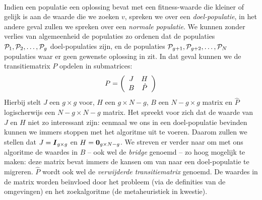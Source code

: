 \paragraph{}

Indien een populatie een oplossing bevat met een fitness-waarde die kleiner of gelijk is aan de waarde die we zoeken $v$, spreken we over een \emph{doel-populatie}, in het andere geval zullen we spreken over een \emph{normale populatie}. We kunnen zonder verlies van algemeenheid de populaties zo ordenen dat de populaties $\PopSet_1,\PopSet_2,\ldots,\PopSet_g$ doel-populaties zijn, en de populaties $\PopSet_{g+1},\PopSet_{g+2},\ldots,\PopSet_N$ populaties waar er geen gewenste oplossing in zit. In dat geval kunnen we de transitiematrix $P$ opdelen in submatrices:
\begin{equation}
P=\brak{\begin{array}{cc}
J&H\\
B&\hat{P}
\end{array}}
\end{equation}
Hierbij stelt $J$ een $g\times g$ voor, $H$ een $g\times N-g$, $B$ een $N-g\times g$ matrix en $\hat{P}$ logischerwijs een $N-g\times N-g$ matrix. Het spreekt voor zich dat de waarde van $J$ en $H$ niet zo interessant zijn: eenmaal we ons in een doel-populatie bevinden kunnen we immers stoppen met het algoritme uit te voeren. Daarom zullen we stellen dat $J=\identitymatrix[g\times g]$ en $H=\zeromatrix[g\times N-g]$. We streven er verder naar om met ons algoritme de waardes in $B$ -- ook wel de \emph{bridge} genoemd -- zo hoog mogelijk te maken: deze matrix bevat immers de kansen om van naar een doel-populatie te migreren. $\hat{P}$ wordt ook wel de \emph{verwijderde transitiematrix} genoemd. De waardes in de matrix worden be\"invloed door het probleem (via de definities van de omgevingen) en het zoekalgoritme (de metaheuristiek in kwestie).
